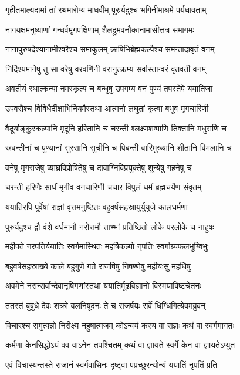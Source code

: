\twolineshloka
{गृहीतमाल्यदामां तां रथमारोप्य माधवीम्}
{पूरुर्यदुश्च भगिनीमाश्रमे पर्यधावताम्}


\twolineshloka
{नागयक्षमनुष्याणां गन्धर्वमृगपक्षिणाम्}
{शैलद्रुमवनौकानामासीत्तत्र समागमः}


\twolineshloka
{नानापुरुषदेश्यानामीश्वरैश्च समाकुलम्}
{ऋषिभिर्ब्रह्मकल्पैश्च समन्तादावृतं वनम्}


\twolineshloka
{निर्दिश्यमानेषु तु सा वरेषु वरवर्णिनी}
{वरानुत्क्रम्य सर्वास्तान्वरं वृतवती वनम्}


\twolineshloka
{अवतीर्य रथात्कन्या नमस्कृत्य च बन्धुषु}
{उपगम्य वनं पुण्यं तपस्तेपे ययातिजा}


\twolineshloka
{उपवसैश्च विविधैर्दीक्षाभिर्नियमैस्तथा}
{आत्मनो लघुतां कृत्वा बभूव मृगचारिणी}


\twolineshloka
{वैदूर्याङ्कुरकल्पानि मृदूनि हरितानि च}
{चरन्ती श्लक्ष्णशष्पाणि तिक्तानि मधुराणि च}


\twolineshloka
{स्रवन्तीनां च पुण्यानां सुरसानि सुचीनि च}
{पिबन्ती वारिमुख्यानि शीतानि विमलानि च}


\twolineshloka
{वनेषु मृगराजेषु व्याघ्रविप्रोषितेषु च}
{दावाग्निविप्रयुक्तेषु शून्येषु गहनेषु च}


\twolineshloka
{चरन्ती हरिणैः सार्धं मृगीव वनचारिणी}
{चचार विपुलं धर्मं ब्रह्मचर्येण संवृतम्}


\twolineshloka
{ययातिरपि पूर्वेषां राज्ञां वृत्तमनुष्ठितः}
{बहुवर्षसहस्रायुर्युयुजे कालधर्मणा}


\twolineshloka
{पुरुर्यदुश्च द्वौ वंशे वर्धमानौ नरोत्तमौ}
{ताभ्भां प्रतिष्ठितो लोके परलोके च नाहुषः}


\twolineshloka
{महीपते नरपतिर्ययातिः स्वर्गमास्थितः}
{महर्षिकल्पो नृपतिः स्वर्गाग्र्यफलभुग्विभुः}


\twolineshloka
{बहुवर्षसहस्राख्ये काले बहुगुणे गते}
{राजर्षिषु निषण्णेषु महीयःसु महर्धिषु}


\twolineshloka
{अवमेने नरान्सर्वान्देवानृषिगणांस्तथा}
{ययातिर्मूढविज्ञानो विस्मयाविष्टचेतनः}


\twolineshloka
{ततस्तं बुबुधे देवः शक्रो बलनिषूदनः}
{ते च राजर्षयः सर्वे धिग्धिगित्येवमब्रुवन्}


\twolineshloka
{विचारश्च समुत्पन्नो निरीक्ष्य नहुषात्मजम्}
{कोऽन्वयं कस्य वा राज्ञः कथं वा स्वर्गमागतः}


\twolineshloka
{कर्मणा केनसिद्धोऽयं क्व वाऽनेन तपश्चितम्}
{कथं वा ज्ञायते स्वर्गे केन वा ज्ञायतेऽप्युत}


\twolineshloka
{एवं विचास्यन्तस्ते राजानं स्वर्गवासिनः}
{दृष्ट्वा पप्रच्छुरन्योन्यं ययातिं नृपतिं प्रति}


